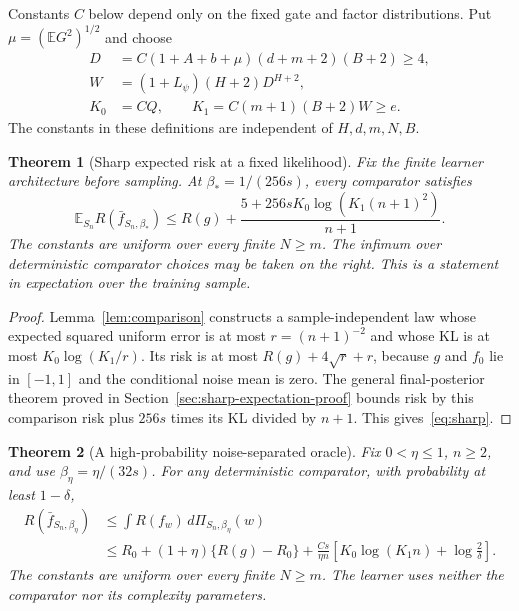 \documentclass[11pt]{article}
\newtheorem{theorem}{Theorem}[section]\newtheorem{lemma}[theorem]{Lemma}
\theoremstyle{remark}\newtheorem{remark}[theorem]{Remark}
\newcommand{\E}{\mathbb E}\newcommand{\R}{\mathbb R}\newcommand{\Pp}{\mathbb P}
\begin{document}
Constants $C$ below depend only on the fixed gate and factor distributions. Put $\mu=(\E G^2)^{1/2}$ and choose
\begin{align}
 D&=C(1+A+b+\mu)(d+m+2)(B+2)\ge4,\\
 W&=(1+L_\psi)(H+2)D^{H+2},\\
 K_0&=CQ,\qquad
 K_1=C(m+1)(B+2)W\ge e.
 \label{eq:resources}
\end{align}
The constants in these definitions are independent of $H,d,m,N,B$.

\begin{theorem}[Sharp expected risk at a fixed likelihood]\label{thm:sharp}
Fix the finite learner architecture before sampling. At
$\beta_*=1/(256s)$, every comparator satisfies
\begin{equation}
 \E_{S_n}R(\bar f_{S_n,\beta_*})
 \le R(g)+\frac{5+256sK_0\log(K_1(n+1)^2)}{n+1}.
 \label{eq:sharp}
\end{equation}
The constants are uniform over every finite $N\ge m$. The infimum over deterministic comparator choices may be taken on the right. This is a statement in expectation over the training sample.
\end{theorem}
\begin{proof}
Lemma~\ref{lem:comparison} constructs a sample-independent law whose expected squared uniform error is at most $r=(n+1)^{-2}$ and whose KL is at most $K_0\log(K_1/r)$. Its risk is at most $R(g)+4\sqrt r+r$, because $g$ and $f_0$ lie in $[-1,1]$ and the conditional noise mean is zero. The general final-posterior theorem proved in Section~\ref{sec:sharp-expectation-proof} bounds risk by this comparison risk plus $256s$ times its KL divided by $n+1$. This gives~\eqref{eq:sharp}.
\end{proof}

\begin{theorem}[A high-probability noise-separated oracle]\label{thm:main}
Fix $0<\eta\le1$, $n\ge2$, and use $\beta_\eta=\eta/(32s)$. For any deterministic comparator, with probability at least $1-\delta$,
\begin{align}
 R(\bar f_{S_n,\beta_\eta})
 &\le \int R(f_w)\,d\Pi_{S_n,\beta_\eta}(w)\\
 &\le R_0+(1+\eta)\{R(g)-R_0\}
 +\frac{Cs}{\eta n}\left[K_0\log(K_1n)+\log\frac2\delta\right].
 \label{eq:hp}
\end{align}
The constants are uniform over every finite $N\ge m$. The learner uses neither the comparator nor its complexity parameters.
\end{theorem}
\end{document}
